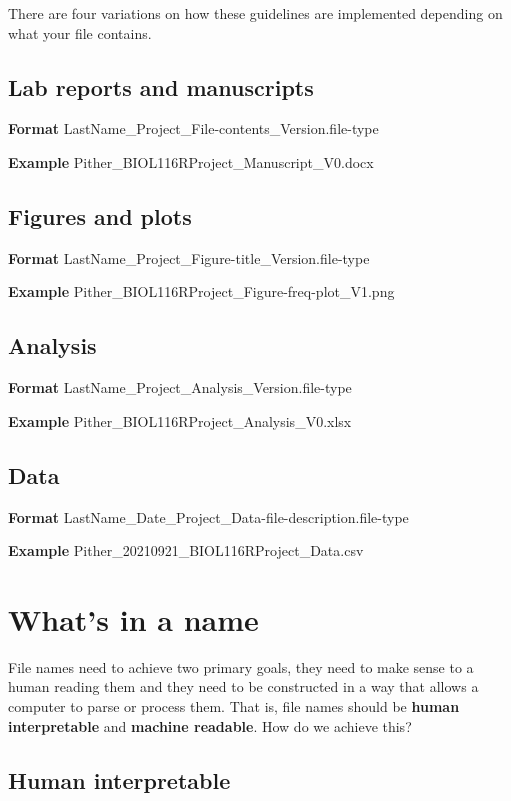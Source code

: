 \documentclass[
]{book}
\begin{document}
There are four variations on how these guidelines are implemented depending on what your file contains.

\subsection{Lab reports and manuscripts}\label{lab-reports-and-manuscripts}

\textbf{Format} LastName\_Project\_File-contents\_Version.file-type

\textbf{Example} Pither\_BIOL116RProject\_Manuscript\_V0.docx

\subsection{Figures and plots}\label{figures-and-plots}

\textbf{Format} LastName\_Project\_Figure-title\_Version.file-type

\textbf{Example} Pither\_BIOL116RProject\_Figure-freq-plot\_V1.png

\subsection{Analysis}\label{analysis}

\textbf{Format} LastName\_Project\_Analysis\_Version.file-type

\textbf{Example} Pither\_BIOL116RProject\_Analysis\_V0.xlsx

\subsection{Data}\label{data}

\textbf{Format} LastName\_Date\_Project\_Data-file-description.file-type

\textbf{Example} Pither\_20210921\_BIOL116RProject\_Data.csv

\section{What's in a name}\label{whats-in-a-name}

File names need to achieve two primary goals, they need to make sense to a human reading them and they need to be constructed in a way that allows a computer to parse or process them. That is, file names should be \textbf{human interpretable} and \textbf{machine readable}. How do we achieve this?

\subsection*{Human interpretable}\label{human-interpretable}
\end{document}
